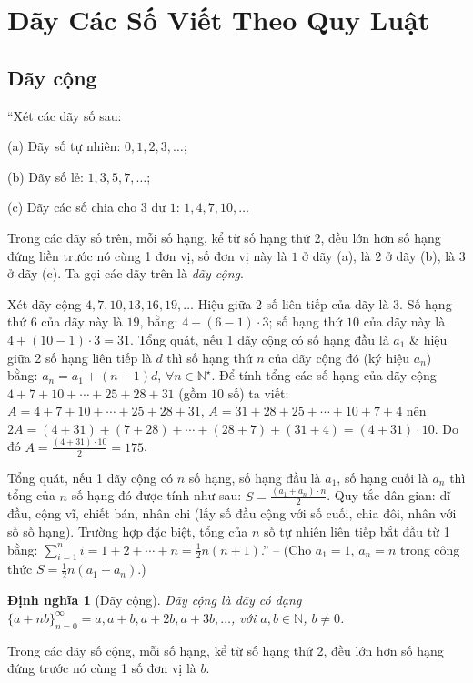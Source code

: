 \documentclass{article}
\numberwithin{equation}{section}
\newtheorem{dinhnghia}{Định nghĩa}[section]
\begin{document}
\section{Dãy Các Số Viết Theo Quy Luật}

\subsection{Dãy cộng}
``Xét các dãy số sau:
\begin{enumerate*}
	\item[(a)] Dãy số tự nhiên: $0,1,2,3,\ldots$;
	\item[(b)] Dãy số lẻ: $1,3,5,7,\ldots$;
	\item[(c)] Dãy các số chia cho $3$ dư $1$: $1,4,7,10,\ldots$
\end{enumerate*}
Trong các dãy số trên, mỗi số hạng, kể từ số hạng thứ 2, đều lớn hơn số hạng đứng liền trước nó cùng 1 đơn vị, số đơn vị này là $1$ ở dãy (a), là $2$ ở dãy (b), là $3$ ở dãy (c). Ta gọi các dãy trên là \textit{dãy cộng}.

Xét dãy cộng $4,7,10,13,16,19,\ldots$ Hiệu giữa 2 số liên tiếp của dãy là $3$. Số hạng thứ 6 của dãy này là $19$, bằng: $4 + (6 - 1)\cdot3$; số hạng thứ $10$ của dãy này là $4 + (10 - 1)\cdot3 = 31$. Tổng quát, nếu 1 dãy cộng có số hạng đầu là $a_1$ \& hiệu giữa 2 số hạng liên tiếp là $d$ thì số hạng thứ $n$ của dãy cộng đó (ký hiệu $a_n$) bằng: $a_n = a_1 + (n - 1)d$, $\forall n\in\mathbb{N}^\star$. Để tính tổng các số hạng của dãy cộng $4 + 7 + 10 + \cdots + 25 + 28 + 31$ (gồm $10$ số) ta viết: $A = 4 + 7 + 10 + \cdots + 25 + 28 + 31$, $A = 31 + 28 + 25 + \cdots + 10 + 7 + 4$ nên $2A = (4 + 31) + (7 + 28) + \cdots + (28 + 7) + (31 + 4) = (4 + 31)\cdot10$. Do đó $A = \frac{(4 + 31)\cdot10}{2} = 175$.

Tổng quát, nếu 1 dãy cộng có $n$ số hạng, số hạng đầu là $a_1$, số hạng cuối là $a_n$ thì tổng của $n$ số hạng đó được tính như sau: $S = \frac{(a_1 + a_n)\cdot n}{2}$. Quy tắc dân gian: dĩ đầu, cộng vĩ, chiết bán, nhân chi (lấy số đầu cộng với số cuối, chia đôi, nhân với số số hạng). Trường hợp đặc biệt, tổng của $n$ số tự nhiên liên tiếp bắt đầu từ 1 bằng: $\sum_{i=1}^n i = 1 + 2 + \cdots + n = \frac{1}{2}n(n + 1)$.'' -- \cite[Chuyên đề 2, pp. 51--52]{Binh_Toan_6_tap_1} (Cho $a_1 = 1$, $a_n = n$ trong công thức $S = \frac{1}{2}n(a_1 + a_n)$.)

\begin{dinhnghia}[Dãy cộng]
	\emph{Dãy cộng} là dãy có dạng $\{a + n b\}_{n=0}^\infty = a, a + b, a + 2b, a + 3b,\ldots$, với $a,b\in\mathbb{N}$, $b\ne 0$.
\end{dinhnghia}
Trong các dãy số cộng, mỗi số hạng, kể từ số hạng thứ 2, đều lớn hơn số hạng đứng trước nó cùng 1 số đơn vị là $b$.
\end{document}
